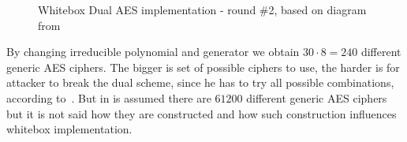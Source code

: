 \documentclass[11pt,oneside,final]{fithesis2}
\begin{document}
	\begin{figure}
	\begin{center}
	\leavevmode
	\centerline{}
	\end{center}
	\caption{Whitebox Dual AES implementation - round \#2, based on diagram from~\citep{Muir_atutorial}}
	\label{fig:wbaesdual}
	\end{figure}
	
	By changing irreducible polynomial and generator we obtain $30 \cdot 8 = 240$ different generic AES ciphers. The bigger is set of possible ciphers to use, the harder is
	for attacker to break the dual scheme, since he has to try all possible combinations, according to~\citep{Karroumi:2010:PWA:2041036.2041060}. But in 
	\citep{Karroumi:2010:PWA:2041036.2041060} is assumed there are $61200$ different generic AES ciphers but it is not said how they are constructed and how 
	such construction influences whitebox implementation.
	
\end{document}
